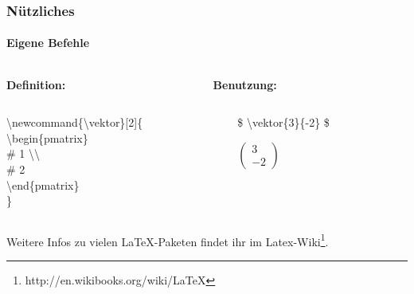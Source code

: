 \begin{frame}
\frametitle{Nützliches}
\framesubtitle{Eigene Befehle}
\begin{columns}
\hspace*{4.7mm}
\begin{column}{0.5\textwidth}
\textbf{Definition:}\\
\end{column}
\begin{column}{0.5\textwidth}
\textbf{Benutzung:}\\
\end{column}
\end{columns}
\bigskip
\begin{columns}
\hspace*{4.7mm}
\begin{column}{0.5\textwidth}
\begin{ttfamily}{\normalsize
\color{nounibaredI}\textbackslash newcommand\color{black}\{\textbackslash vektor\}[2]\{\\
\color{unibablueI}\textbackslash begin\color{black}\{pmatrix\}\\
\color{unibayellowI}\# 1 \color{nounibaredI}\textbackslash \textbackslash\\
\color{unibayellowI} \# 2\\
\color{unibablueI}\textbackslash end\color{black}\{pmatrix\}\\
\}\\
}
\end{ttfamily}
\end{column}
\begin{column}{0.5\textwidth}
\begin{ttfamily}{\normalsize
\color{unibayellowI}\$ \color{nounibaredI}\textbackslash vektor\color{black}\{3\}\{-2\} \color{unibayellowI}\$ \\}
\end{ttfamily}
\medskip
$
\begin{pmatrix}
3 \\ -2
\end{pmatrix}
$
\end{column}
\end{columns}
\bigskip
Weitere Infos zu vielen \LaTeX -Paketen findet ihr im Latex-Wiki\footnote{http://en.wikibooks.org/wiki/LaTeX}.\\
\end{frame}

